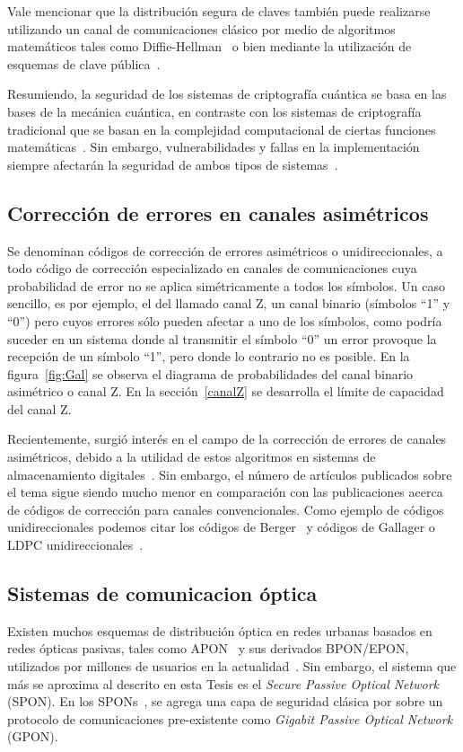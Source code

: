 Vale mencionar que la distribución segura de claves también puede realizarse utilizando un canal de comunicaciones clásico por medio de algoritmos matemáticos tales como Diffie-Hellman~\cite{diffie1976new} o bien mediante la utilización de esquemas de clave pública~\cite{kohnfelder1978towards}.

Resumiendo, la seguridad de los sistemas de criptografía cuántica se basa en las bases de la mecánica cuántica, en contraste con los sistemas de criptografía tradicional que se basan en la complejidad computacional de ciertas funciones matemáticas~\cite{kohnfelder1978towards}. Sin embargo, vulnerabilidades y fallas en la implementación siempre afectarán la seguridad de ambos tipos de sistemas~\cite{lydersen2010hacking}.


\subsection{Corrección de errores en canales asimétricos}
 
Se denominan códigos de corrección de errores asimétricos o unidireccionales, a todo código de corrección especializado en canales de comunicaciones cuya probabilidad de error no se aplica simétricamente a todos los símbolos. Un caso sencillo, es por ejemplo, el del llamado canal Z, un canal binario (símbolos ``1'' y ``0'') pero cuyos errores sólo pueden afectar a uno de los símbolos, como podría suceder en un sistema donde al transmitir el símbolo ``0'' un error provoque la recepción de un símbolo ``1'', pero donde lo contrario no es posible. En la figura~\ref{fig:Gal} se observa el diagrama de probabilidades del canal binario asimétrico o canal Z. En la sección~\ref{canalZ} se desarrolla el límite de capacidad del canal Z.

Recientemente, surgió interés en el campo de la corrección de errores de canales asimétricos, debido a la utilidad de estos algoritmos en sistemas de almacenamiento digitales~\cite{tanakamaru201195}. Sin embargo, el número de artículos publicados sobre el tema sigue siendo mucho menor en comparación con las publicaciones acerca de códigos de corrección para canales convencionales. Como ejemplo de códigos unidireccionales podemos citar los códigos de Berger~\cite{berger1961note} y códigos de Gallager o LDPC unidireccionales~\cite{neri2008gallager}.

\subsection{Sistemas de comunicacion óptica}
\label{defPON}
Existen muchos esquemas de distribución óptica en redes urbanas basados en redes ópticas pasivas, tales como APON~\cite{kramer2002ethernet} y sus derivados BPON/EPON, utilizados por millones de usuarios en la actualidad~\cite{chanclou2013france}.
Sin embargo, el sistema que más se aproxima al descrito en esta Tesis es el \textit{Secure Passive Optical Network} (SPON). En los SPONs~\cite{armoredshield}, se agrega una capa de seguridad clásica por sobre un protocolo de comunicaciones pre-existente como \textit{Gigabit Passive Optical Network} (GPON).

